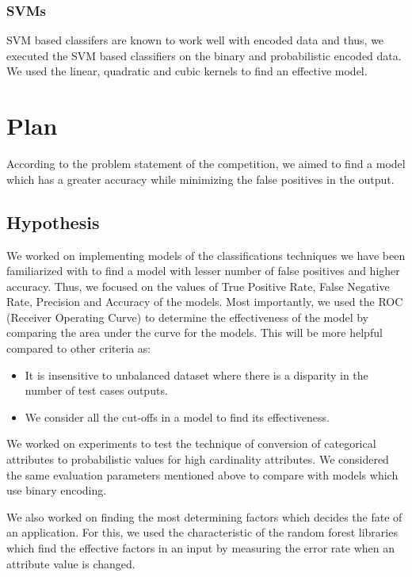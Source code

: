 \documentclass{article} %
\begin{document}
	\subsubsection{SVMs}
	SVM based classifers are known to work well with encoded data and thus, we executed the SVM based classifiers on the binary and probabilistic encoded data. We used the linear, quadratic and cubic kernels to find an effective model. 
	
	\section{Plan}
	According to the problem statement of the competition, we aimed to find a model which has a greater accuracy while minimizing the false positives in the output.
	
	\subsection{Hypothesis}
	We worked on implementing models of the classifications techniques we have been familiarized with to find a model with lesser number of false positives and higher accuracy. Thus, we focused on the values of True Positive Rate, False Negative Rate, Precision and Accuracy of the models. Most importantly, we used the ROC (Receiver Operating Curve) to determine the effectiveness of the model by comparing the area under the curve for the models. This will be more helpful compared to other criteria as:
	\begin{itemize}
		\item It is insensitive to unbalanced dataset where there is a disparity in the number of test cases outputs.  
		\item We consider all the cut-offs in a model to find its effectiveness.
	\end{itemize}
	
	We worked on experiments to test the technique of conversion of categorical attributes to probabilistic values for high cardinality attributes\cite{HighCard}. We considered the same evaluation parameters mentioned above to compare with models which use binary encoding. 
	
	We also worked on finding the most determining factors which decides the fate of an application. For this, we used the characteristic of the random forest libraries which find the effective factors in an input by measuring the error rate when an attribute value is changed. 
\end{document}
